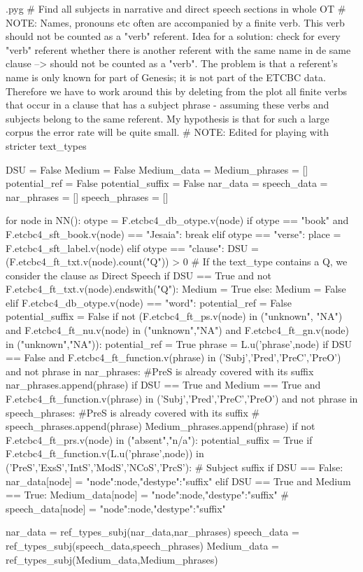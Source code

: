 \documentclass{report}
\makeatletter
\newenvironment{python}{%
  \VerbatimEnvironment
  \minted@resetoptions
  \setkeys{minted@opt}{}
      \begin{VerbatimOut}{\jobname.pyg}}
{%
      \end{VerbatimOut}
      \minted@pygmentize{python}
      \DeleteFile{\jobname.pyg}}
\makeatother
\begin{document}
\begin{python}
# Find all subjects in narrative and direct speech sections in whole OT 
# NOTE: Names, pronouns etc often are accompanied by a finite verb. This verb should not be counted as a "verb" referent. Idea for a solution: check for every "verb" referent whether there is another referent with the same name in de same clause --> should not be counted as a "verb". The problem is that a referent's name is only known for part of Genesis; it is not part of the ETCBC data. Therefore we have to work around this by deleting from the plot all finite verbs that occur in a clause that has a subject phrase - assuming these verbs and subjects belong to the same referent. My hypothesis is that for such a large corpus the error rate will be quite small.
# NOTE: Edited for playing with stricter text_types

DSU = False
Medium = False
Medium_data = {}
Medium_phrases = []
potential_ref = False
potential_suffix = False
nar_data = {}
speech_data = {}
nar_phrases = []
speech_phrases = []

for node in NN():
    otype = F.etcbc4_db_otype.v(node)
    if otype == "book" and F.etcbc4_sft_book.v(node) == "Jesaia":
        break
    elif otype == "verse":
        place = F.etcbc4_sft_label.v(node)
    elif otype == "clause":
        DSU = (F.etcbc4_ft_txt.v(node).count("Q")) > 0   # If the text_type contains a Q, we consider the clause as Direct Speech
        if DSU == True and not F.etcbc4_ft_txt.v(node).endswith("Q"):     
            Medium = True
        else:
            Medium = False
    elif F.etcbc4_db_otype.v(node) == "word":
        potential_ref = False
        potential_suffix = False
        if not (F.etcbc4_ft_ps.v(node) in ("unknown", "NA") and F.etcbc4_ft_nu.v(node) in ("unknown","NA") and F.etcbc4_ft_gn.v(node) in ("unknown","NA")):
            potential_ref = True
            phrase = L.u('phrase',node)
            if DSU == False and F.etcbc4_ft_function.v(phrase) in ('Subj','Pred','PreC','PreO') and not phrase in nar_phrases: #PreS is already covered with its suffix
                nar_phrases.append(phrase)
            if DSU == True and Medium == True and F.etcbc4_ft_function.v(phrase) in ('Subj','Pred','PreC','PreO') and not phrase in speech_phrases: #PreS is already covered with its suffix
#                speech_phrases.append(phrase) 
                Medium_phrases.append(phrase)
        if not F.etcbc4_ft_prs.v(node) in ("absent","n/a"):
            potential_suffix = True
            if F.etcbc4_ft_function.v(L.u('phrase',node)) in ('PreS','ExsS','IntS','ModS','NCoS','PrcS'): # Subject suffix
                if DSU == False:
                    nar_data[node] = {"node":node,"destype":"suffix"}
                elif DSU == True and Medium == True:
                    Medium_data[node] = {"node":node,"destype":"suffix"}
#                    speech_data[node] = {"node":node,"destype":"suffix"}

nar_data = ref_types_subj(nar_data,nar_phrases)
speech_data = ref_types_subj(speech_data,speech_phrases)
Medium_data = ref_types_subj(Medium_data,Medium_phrases)

\end{python}
\end{document}

